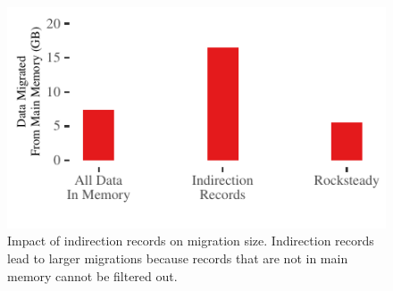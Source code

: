 \begin{figure}[t]
\centering
\includegraphics[width=0.9\columnwidth]{graphs/migration-size.pdf}
\caption{Impact of indirection records on migration size. Indirection
    records lead to larger migrations because records that are not in
    main memory cannot be filtered out.}
\label{fig:migration-size}
\end{figure}
